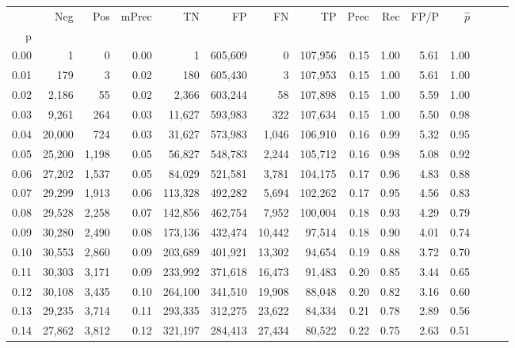 \begin{tabular}{rrrrrrrrrrrrrrr}
\toprule
{} &     Neg &    Pos & mPrec &       TN &       FP &       FN &       TP &  Prec &   Rec &  FP/P & $\hat{p}$ \\
p    &         &        &       &          &          &          &          &       &       &       &           \\
\midrule
0.00 &       1 &      0 &  0.00 &        1 &  605,609 &        0 &  107,956 &  0.15 &  1.00 &  5.61 &      1.00 \\
0.01 &     179 &      3 &  0.02 &      180 &  605,430 &        3 &  107,953 &  0.15 &  1.00 &  5.61 &      1.00 \\
0.02 &   2,186 &     55 &  0.02 &    2,366 &  603,244 &       58 &  107,898 &  0.15 &  1.00 &  5.59 &      1.00 \\
0.03 &   9,261 &    264 &  0.03 &   11,627 &  593,983 &      322 &  107,634 &  0.15 &  1.00 &  5.50 &      0.98 \\
0.04 &  20,000 &    724 &  0.03 &   31,627 &  573,983 &    1,046 &  106,910 &  0.16 &  0.99 &  5.32 &      0.95 \\
0.05 &  25,200 &  1,198 &  0.05 &   56,827 &  548,783 &    2,244 &  105,712 &  0.16 &  0.98 &  5.08 &      0.92 \\
0.06 &  27,202 &  1,537 &  0.05 &   84,029 &  521,581 &    3,781 &  104,175 &  0.17 &  0.96 &  4.83 &      0.88 \\
0.07 &  29,299 &  1,913 &  0.06 &  113,328 &  492,282 &    5,694 &  102,262 &  0.17 &  0.95 &  4.56 &      0.83 \\
0.08 &  29,528 &  2,258 &  0.07 &  142,856 &  462,754 &    7,952 &  100,004 &  0.18 &  0.93 &  4.29 &      0.79 \\
0.09 &  30,280 &  2,490 &  0.08 &  173,136 &  432,474 &   10,442 &   97,514 &  0.18 &  0.90 &  4.01 &      0.74 \\
0.10 &  30,553 &  2,860 &  0.09 &  203,689 &  401,921 &   13,302 &   94,654 &  0.19 &  0.88 &  3.72 &      0.70 \\
0.11 &  30,303 &  3,171 &  0.09 &  233,992 &  371,618 &   16,473 &   91,483 &  0.20 &  0.85 &  3.44 &      0.65 \\
0.12 &  30,108 &  3,435 &  0.10 &  264,100 &  341,510 &   19,908 &   88,048 &  0.20 &  0.82 &  3.16 &      0.60 \\
0.13 &  29,235 &  3,714 &  0.11 &  293,335 &  312,275 &   23,622 &   84,334 &  0.21 &  0.78 &  2.89 &      0.56 \\
0.14 &  27,862 &  3,812 &  0.12 &  321,197 &  284,413 &   27,434 &   80,522 &  0.22 &  0.75 &  2.63 &      0.51 \\

\end{tabular}
